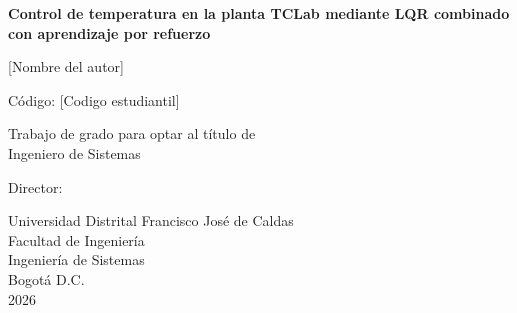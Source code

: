 \documentclass[12pt,letterpaper,oneside]{report}
\newcommand{\titulotesis}{Control de temperatura en la planta TCLab mediante LQR
combinado con aprendizaje por refuerzo}
\newcommand{\autortesis}{[Nombre del autor]}
\newcommand{\codigoestudiante}{[Codigo estudiantil]}
\newcommand{\directortesis}{[Nombre del director]}
\newcommand{\aniotesis}{2026}
\begin{document}
\begin{titlepage}
\thispagestyle{empty}
\centering

{\large\bfseries \titulotesis \par}
\vspace{2.5cm}

{\normalsize \autortesis \par}
{\normalsize Código: \codigoestudiante \par}
\vspace{2.5cm}

{\normalsize Trabajo de grado para optar al título de\\
Ingeniero de Sistemas \par}
\vspace{2cm}

{\normalsize Director:\\ \directortesis \par}
\vfill

{\normalsize
Universidad Distrital Francisco José de Caldas\\
Facultad de Ingeniería\\
Ingeniería de Sistemas\\
Bogotá D.C.\\
\aniotesis \par}

\end{titlepage}

\setcounter{page}{2}



\tableofcontents
\listoffigures
\listoftables

\cleardoublepage
{}
\setcounter{page}{1}










\cleardoublepage
\printbibliography[heading=bibintoc, title={Referencias}]

\begin{appendices}

\end{appendices}
\end{document}

